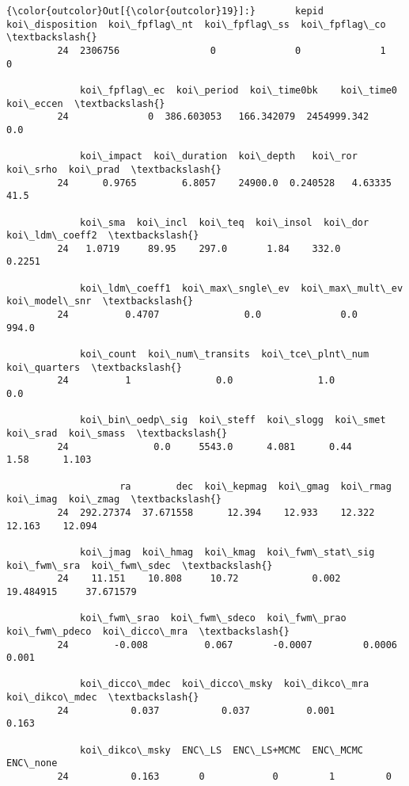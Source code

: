 \documentclass[11pt]{article}
\begin{document}
\begin{Verbatim}[commandchars=\\\{\}]
{\color{outcolor}Out[{\color{outcolor}19}]:}       kepid  koi\_disposition  koi\_fpflag\_nt  koi\_fpflag\_ss  koi\_fpflag\_co  \textbackslash{}
         24  2306756                0              0              1              0   
         
             koi\_fpflag\_ec  koi\_period  koi\_time0bk    koi\_time0  koi\_eccen  \textbackslash{}
         24              0  386.603053   166.342079  2454999.342        0.0   
         
             koi\_impact  koi\_duration  koi\_depth   koi\_ror  koi\_srho  koi\_prad  \textbackslash{}
         24      0.9765        6.8057    24900.0  0.240528   4.63335      41.5   
         
             koi\_sma  koi\_incl  koi\_teq  koi\_insol  koi\_dor  koi\_ldm\_coeff2  \textbackslash{}
         24   1.0719     89.95    297.0       1.84    332.0          0.2251   
         
             koi\_ldm\_coeff1  koi\_max\_sngle\_ev  koi\_max\_mult\_ev  koi\_model\_snr  \textbackslash{}
         24          0.4707               0.0              0.0          994.0   
         
             koi\_count  koi\_num\_transits  koi\_tce\_plnt\_num  koi\_quarters  \textbackslash{}
         24          1               0.0               1.0           0.0   
         
             koi\_bin\_oedp\_sig  koi\_steff  koi\_slogg  koi\_smet  koi\_srad  koi\_smass  \textbackslash{}
         24               0.0     5543.0      4.081      0.44      1.58      1.103   
         
                    ra        dec  koi\_kepmag  koi\_gmag  koi\_rmag  koi\_imag  koi\_zmag  \textbackslash{}
         24  292.27374  37.671558      12.394    12.933    12.322    12.163    12.094   
         
             koi\_jmag  koi\_hmag  koi\_kmag  koi\_fwm\_stat\_sig  koi\_fwm\_sra  koi\_fwm\_sdec  \textbackslash{}
         24    11.151    10.808     10.72             0.002    19.484915     37.671579   
         
             koi\_fwm\_srao  koi\_fwm\_sdeco  koi\_fwm\_prao  koi\_fwm\_pdeco  koi\_dicco\_mra  \textbackslash{}
         24        -0.008          0.067       -0.0007         0.0006          0.001   
         
             koi\_dicco\_mdec  koi\_dicco\_msky  koi\_dikco\_mra  koi\_dikco\_mdec  \textbackslash{}
         24           0.037           0.037          0.001           0.163   
         
             koi\_dikco\_msky  ENC\_LS  ENC\_LS+MCMC  ENC\_MCMC  ENC\_none  
         24           0.163       0            0         1         0  
\end{Verbatim}
            
\end{document}
